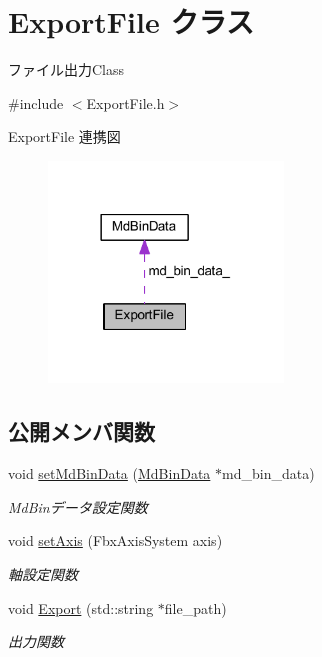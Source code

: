 \hypertarget{class_export_file}{}\section{Export\+File クラス}
\label{class_export_file}


ファイル出力\+Class  




{\ttfamily \#include $<$Export\+File.\+h$>$}



Export\+File 連携図\nopagebreak
\begin{figure}[H]
\begin{center}
\leavevmode
\includegraphics[width=177pt]{class_export_file__coll__graph}
\end{center}
\end{figure}
\subsection*{公開メンバ関数}
\begin{DoxyCompactItemize}
\item 
void \mbox{\hyperlink{class_export_file_a8b1ef14ae42180a8bf491d4d7a4ceb63}{set\+Md\+Bin\+Data}} (\mbox{\hyperlink{class_md_bin_data}{Md\+Bin\+Data}} $\ast$md\+\_\+bin\+\_\+data)
\begin{DoxyCompactList}\small\item\em Md\+Binデータ設定関数 \end{DoxyCompactList}\item 
void \mbox{\hyperlink{class_export_file_a9dd6b27de162bee08b51eb2ae62d8e17}{set\+Axis}} (Fbx\+Axis\+System axis)
\begin{DoxyCompactList}\small\item\em 軸設定関数 \end{DoxyCompactList}\item 
void \mbox{\hyperlink{class_export_file_aadb97e06e12bbe978e5527b4b540ece8}{Export}} (std\+::string $\ast$file\+\_\+path)
\begin{DoxyCompactList}\small\item\em 出力関数 \end{DoxyCompactList}\end{DoxyCompactItemize}
